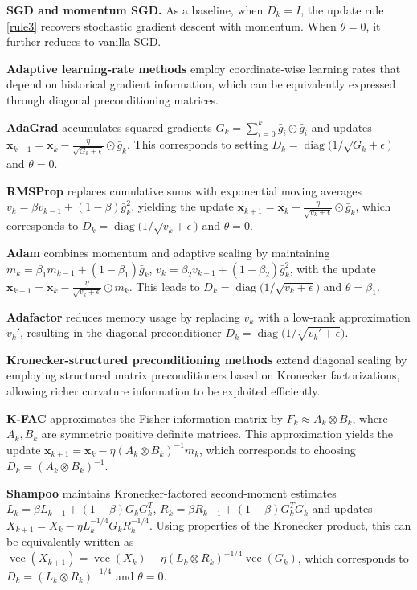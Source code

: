 \documentclass{article}
\newcommand{\bx}{\boldsymbol{x}}
\newcommand{\barg}{\bar{g}}
\theoremstyle{plain}
\theoremstyle{definition}
\theoremstyle{remark}
\begin{document}
\textbf{SGD and momentum SGD.}
As a baseline, when $D_k = I$, the update rule \eqref{rule3} recovers stochastic gradient descent with momentum. When $\theta=0$, it further reduces to vanilla SGD.


\textbf{Adaptive learning-rate methods} employ coordinate-wise learning rates that depend on historical gradient information, which can be equivalently expressed through diagonal preconditioning matrices.


\textbf{AdaGrad} \citep{Duchi2011Adaptive} accumulates squared gradients
$G_k = \sum_{i=0}^k \barg_i \odot \barg_i$ and updates $\bx_{k+1} = \bx_k - \frac{\eta}{\sqrt{G_k + \epsilon}} \odot \barg_k$.
This corresponds to setting $D_k = \operatorname{diag}\!\big(1/\sqrt{G_k+\epsilon}\big)$ and $\theta=0$.



\textbf{RMSProp} \citep{Tieleman2012Lecture} replaces cumulative sums with exponential moving averages
$v_k = \beta v_{k-1} + (1-\beta)\barg_k^2$, yielding the update $\bx_{k+1} = \bx_k - \frac{\eta}{\sqrt{v_k + \epsilon}} \odot \barg_k$,
which corresponds to $D_k = \operatorname{diag}\!\big(1/\sqrt{v_k+\epsilon}\big)$ and $\theta=0$.


\textbf{Adam} \citep{Kingma2014Adam} combines momentum and adaptive scaling by maintaining $m_k = \beta_1 m_{k-1} + (1-\beta_1)\barg_k$, $v_k = \beta_2 v_{k-1} + (1-\beta_2)\barg_k^2$,
with the update $\bx_{k+1} = \bx_k - \frac{\eta}{\sqrt{v_k + \epsilon}} \odot m_k$.
This leads to $D_k = \operatorname{diag}\!\big(1/\sqrt{v_k+\epsilon}\big)$ and $\theta=\beta_1$.


\textbf{Adafactor} \citep{zhai2022scaling,zhao2024deconstructing} reduces memory usage by replacing
$v_k$ with a low-rank approximation $v_k'$, resulting in the diagonal preconditioner
$D_k = \operatorname{diag}\!\big(1/\sqrt{v_k' + \epsilon}\big)$.


\textbf{Kronecker-structured preconditioning methods} extend diagonal scaling by employing structured matrix preconditioners based on Kronecker factorizations, allowing richer curvature information to be exploited efficiently.


\textbf{K-FAC} \citep{martens2015optimizing} approximates the Fisher information matrix by
$F_k \approx A_k \otimes B_k$, where $A_k,B_k$ are symmetric positive definite matrices. This approximation yields the update $\bx_{k+1} = \bx_k - \eta (A_k \otimes B_k)^{-1} m_k$, which corresponds to choosing $D_k = (A_k \otimes B_k)^{-1}$.


\textbf{Shampoo} \citep{Gupta2018Shampoo} maintains Kronecker-factored second-moment estimates $L_k = \beta L_{k-1} + (1-\beta) G_k G_k^T$, $R_k = \beta R_{k-1} + (1-\beta) G_k^T G_k$
and updates $X_{k+1} = X_k - \eta L_k^{-1/4} G_k R_k^{-1/4}$.
Using properties of the Kronecker product, this can be equivalently written as $\operatorname{vec}(X_{k+1})
=
\operatorname{vec}(X_k)
-
\eta (L_k \otimes R_k)^{-1/4} \operatorname{vec}(G_k)$,
which corresponds to $D_k = (L_k \otimes R_k)^{-1/4}$ and $\theta=0$.
\end{document}
